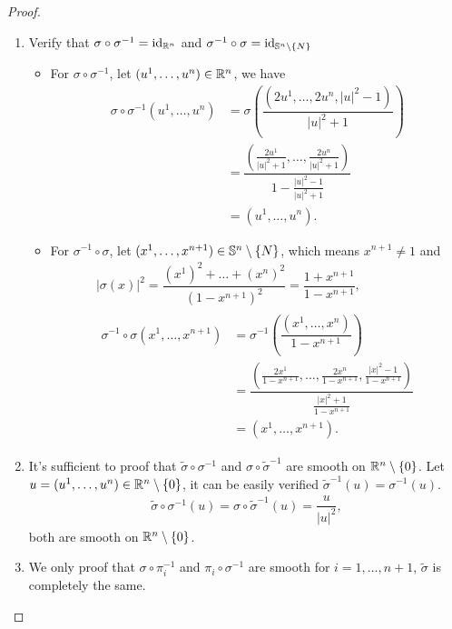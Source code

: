 \begin{problem}
\begin{proof}
\begin{enumerate}
      \item Verify that $\sigma \circ \sigma^{-1} = \text{id}_{\mathbb{R}^n}$ and $\sigma^{-1} \circ \sigma = \text{id}_{\mathbb{S}^n \setminus \{N\}}$
      \begin{itemize}
        \item For $\sigma \circ \sigma^{-1}$, let $(u^1, \dots, u^n) \in \mathbb{R}^n$, we have
        \begin{align*}
          \sigma \circ \sigma^{-1}(u^1, \dots, u^n) &= \sigma \left( \dfrac{(2u^1, \dots, 2u^n, |u|^2-1)}{|u|^2+1}\right)\\[0.5em]
          &= \dfrac{\left(\frac{2u^1}{|u|^2+1}, \dots, \frac{2u^n}{|u|^2+1}\right)}{1-\frac{|u|^2-1}{|u|^2+1}}\\[0.5em]
          &= (u^1, \dots, u^n).
        \end{align*}
        \item For $\sigma^{-1} \circ \sigma$, let $(x^1, \dots, x^{n+1}) \in \mathbb{S}^n \setminus\{N\}$, which means $x^{n+1} \neq 1$ and
        \begin{gather*}
          \left| \sigma(x)\right|^2 = \dfrac{\left(x^1\right)^2 + \dots + \left(x^n\right)^2}{\left(1-x^{n+1}\right)^2} = \dfrac{1+x^{n+1}}{1-x^{n+1}}, \\[0.5em]
          \begin{aligned}
              \sigma^{-1} \circ \sigma(x^1, \dots, x^{n+1}) &= \sigma^{-1}\left(\dfrac{(x^1, \dots, x^n)}{1-x^{n+1}}\right) \\
              &= \dfrac{\left(\frac{2x^1}{1-x^{n+1}}, \dots, \frac{2x^n}{1-x^{n+1}},\frac{|x|^2 - 1}{1-x^{n+1}}\right)}{\frac{|x|^2 + 1}{1-x^{n+1}}} \\
              &= (x^1, \dots, x^{n+1}).
          \end{aligned}
      \end{gather*}
      \end{itemize}
      \item It's sufficient to proof that $\tilde{\sigma} \circ \sigma^{-1}$ and $\sigma \circ \tilde{\sigma}^{-1}$ are smooth on $\mathbb{R}^n \setminus \{0\}$.
      Let $ u = (u^1, \dots, u^n) \in \mathbb{R}^n \setminus \{0\}$, it can be easily verified $\tilde{\sigma}^{-1}(u) = \sigma^{-1}(u)$.
      \begin{align*}
        \tilde{\sigma} \circ \sigma^{-1}(u) = \sigma \circ \tilde{\sigma}^{-1}(u) = \dfrac{u}{|u|^2},
      \end{align*}
      both are smooth on $\mathbb{R}^n \setminus \{0\}$.
      \item We only proof that $\sigma \circ \pi_i^{-1}$ and $\pi_i \circ \sigma^{-1}$ are smooth for $i=1, \dots, n+1$, $\tilde{\sigma}$ is completely the same.

\end{enumerate}
\end{proof}
\end{problem}
